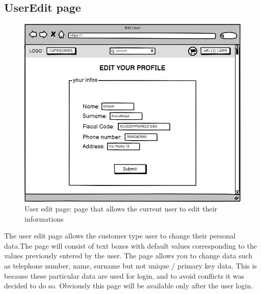 \subsection{UserEdit page}
    \begin{figure}[H]
        \centering
        \includegraphics[width=\textwidth,height=0.7\textheight,keepaspectratio]{mockups/userEditPageMockup.png}
            \caption{User edit page: page that allows the current user to edit their informations}
            \label{fig:UserEdit}
    \end{figure}

The user edit page allows the customer type user to change their personal data.The page will consist of text boxes with default values corresponding to the values previously entered by the user. The page allows you to change data such as telephone number, name, surname but not unique / primary key data. This is because these particular data are used for login, and to avoid conflicts it was decided to do so.
Obviously this page will be available only after the user login.

    
